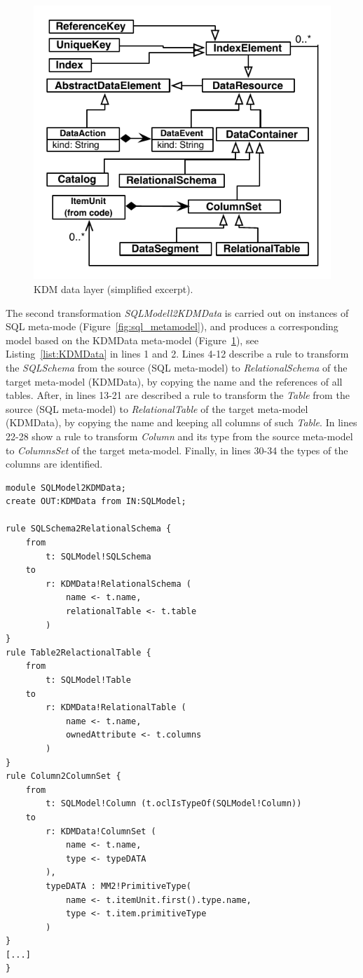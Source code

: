 \documentclass[a4paper,twoside]{article}
\begin{document}
\begin{figure}[!h]
\centering
  \includegraphics[scale=0.78]{figuras/KDM-Data-Layer}
\caption{KDM data layer (simplified excerpt).}
\label{fig:KDMDATA}
\end{figure}

The second transformation \textit{SQLModell2KDMData} is carried out on instances of SQL meta-mode (Figure~\ref{fig:sql_metamodel}), and produces a corresponding model based on the KDMData meta-model (Figure~\ref{fig:KDMDATA}), see Listing~\ref{list:KDMData} in lines 1 and 2. Lines 4-12 describe a rule to transform the \textit{SQLSchema} from the source (SQL meta-model) to \textit{RelationalSchema} of the target meta-model (KDMData), by copying the name and the references of all tables. After, in lines 13-21 are described a rule to transform the \textit{Table} from the source (SQL meta-model) to \textit{RelationalTable} of the target meta-model (KDMData), by copying the name and keeping all columns of such \textit{Table}. In lines 22-28 show a rule to transform \textit{Column} and its type from the source meta-model to \textit{ColumnsSet} of the target meta-model. Finally, in lines 30-34 the types of the columns are identified.

\begin{lstlisting}[caption=Chunk of SQLModel2KDMData, label=list:KDMData, frame=lrtb, basicstyle=\tiny]
module SQLModel2KDMData;
create OUT:KDMData from IN:SQLModel;

rule SQLSchema2RelationalSchema {
	from 
		t: SQLModel!SQLSchema
	to
		r: KDMData!RelationalSchema (	
			name <- t.name,
			relationalTable <- t.table
		)
}
rule Table2RelactionalTable {
	from
		t: SQLModel!Table
	to
		r: KDMData!RelationalTable (
			name <- t.name,
			ownedAttribute <- t.columns
		)
}
rule Column2ColumnSet {	
	from
		t: SQLModel!Column (t.oclIsTypeOf(SQLModel!Column))
	to
		r: KDMData!ColumnSet (
			name <- t.name,
			type <- typeDATA
		),
		typeDATA : MM2!PrimitiveType(
			name <- t.itemUnit.first().type.name,
			type <- t.item.primitiveType
		)
}
[...]
}

\end{lstlisting}
\end{document}
